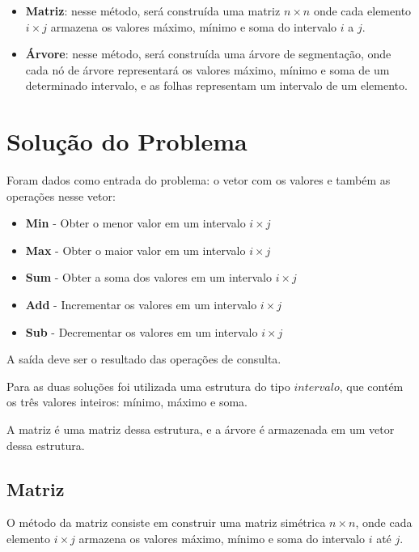 \documentclass[10pt,a4paper]{article}
\begin{document}
	\begin{itemize}

		\item \textbf{Matriz}: nesse método, será construída uma matriz $n \times n$ onde cada elemento $i \times j$ armazena os valores máximo, mínimo e soma do intervalo $i$ a $j$.
		\item \textbf{Árvore}: nesse método, será construída uma árvore de segmentação, onde cada nó de árvore representará os valores máximo, mínimo e soma de um determinado intervalo, e as folhas representam um intervalo de um elemento.

	\end{itemize}

	\section{Solução do Problema}

    Foram dados como entrada do problema: o vetor com os valores e também as operações nesse vetor:

    \begin{itemize}
        \item \textbf{Min} - Obter o menor valor em um intervalo $i \times j$
        \item \textbf{Max} - Obter o maior valor em um intervalo $i \times j$
        \item \textbf{Sum} - Obter a soma dos valores em um intervalo $i \times j$
        \item \textbf{Add} - Incrementar os valores em um intervalo $i \times j$
        \item \textbf{Sub} - Decrementar os valores em um intervalo $i \times j$
    \end{itemize}

    A saída deve ser o resultado das operações de consulta.

    Para as duas soluções foi utilizada uma estrutura do tipo $intervalo$, que contém os três valores inteiros: mínimo, máximo e soma. 

    A matriz é uma matriz dessa estrutura, e a árvore é armazenada em um vetor dessa estrutura.

    \subsection{Matriz}

    O método da matriz consiste em construir uma matriz simétrica $n \times n$, onde cada elemento $i \times j$ armazena os valores máximo, mínimo e soma do intervalo $i$ até $j$.
\end{document}
